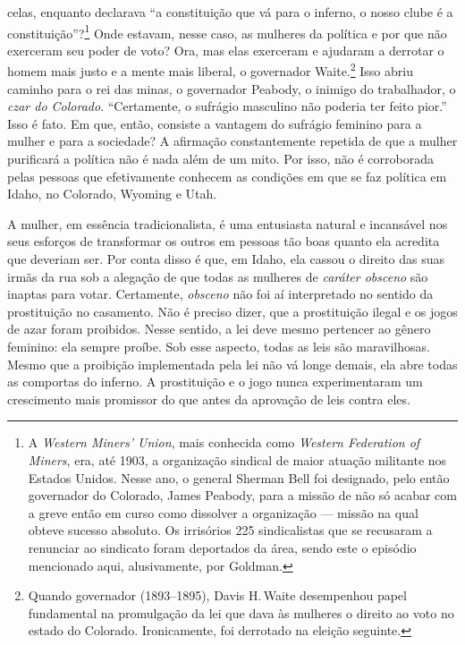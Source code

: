 celas, enquanto declarava ``a constituição que vá para o inferno, o nosso clube é
a constituição''?\footnote{A \textit{Western Miners' Union}, mais conhecida como \textit{Western Federation of Miners}, era, até 1903, a organização sindical de maior atuação militante nos Estados Unidos. Nesse ano, o general Sherman Bell foi designado, pelo então governador do Colorado, James Peabody, para a missão de não só acabar com a greve então em curso como dissolver a organização --- missão na qual obteve sucesso absoluto. Os irrisórios 225 sindicalistas que se recusaram a renunciar ao sindicato foram deportados da área, sendo este o episódio mencionado aqui, alusivamente, por Goldman.} Onde estavam, nesse caso, as mulheres da política e
por que não exerceram seu poder de voto? Ora, mas elas exerceram e
ajudaram a derrotar o homem mais justo e a mente mais liberal, o
governador Waite.\footnote{Quando governador (1893--1895), Davis H.\,Waite desempenhou papel fundamental na
  promulgação da lei que dava às mulheres o direito ao voto no estado do
  Colorado. Ironicamente, foi derrotado na eleição seguinte.} Isso abriu
caminho para o rei das minas, o governador Peabody, o inimigo do
trabalhador, o \textit{czar do Colorado}. ``Certamente, o sufrágio masculino não
poderia ter feito pior.'' Isso é fato. Em que, então, consiste a
vantagem do sufrágio feminino para a mulher e para a sociedade? A
afirmação constantemente repetida de que a mulher purificará a política
não é nada além de um mito. Por isso, não é corroborada pelas pessoas
que efetivamente conhecem as condições em que se faz política em Idaho,
no Colorado, Wyoming e Utah.

A mulher, em essência tradicionalista, é uma entusiasta natural e
incansável nos seus esforços de transformar os outros em pessoas tão
boas quanto ela acredita que deveriam ser. Por conta disso é que, em
Idaho, ela cassou o direito das suas irmãs da rua sob a alegação de que
todas as mulheres de \textit{caráter obsceno} são inaptas para votar.
Certamente, \textit{obsceno} não foi aí interpretado no sentido da
prostituição no casamento. Não é preciso dizer, que a
prostituição ilegal e os jogos de azar foram proibidos. Nesse sentido, a
lei deve mesmo pertencer ao gênero feminino: ela sempre proíbe. Sob esse
aspecto, todas as leis são maravilhosas. Mesmo que a proibição
implementada pela lei não vá longe demais, ela abre todas as comportas
do inferno. A prostituição e o jogo nunca experimentaram um crescimento
mais promissor do que antes da aprovação de leis contra eles.

